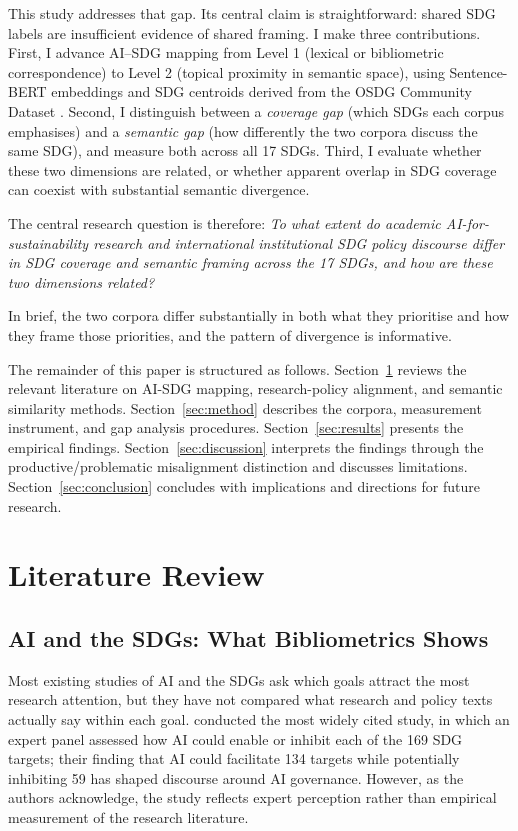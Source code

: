 \documentclass[12pt,a4paper]{article}
\begin{document}
This study addresses that gap. Its central claim is straightforward: shared SDG labels are insufficient evidence of shared framing. I make three contributions. First, I advance AI--SDG mapping from Level 1 (lexical or bibliometric correspondence) to Level 2 (topical proximity in semantic space), using Sentence-BERT \parencite{Reimers2019} embeddings and SDG centroids derived from the OSDG Community Dataset \parencite{Pukelis2022}. Second, I distinguish between a \emph{coverage gap} (which SDGs each corpus emphasises) and a \emph{semantic gap} (how differently the two corpora discuss the same SDG), and measure both across all 17 SDGs. Third, I evaluate whether these two dimensions are related, or whether apparent overlap in SDG coverage can coexist with substantial semantic divergence.

The central research question is therefore: \emph{To what extent do academic AI-for-sustainability research and international institutional SDG policy discourse differ in SDG coverage and semantic framing across the 17 SDGs, and how are these two dimensions related?}

In brief, the two corpora differ substantially in both what they prioritise and how they frame those priorities, and the pattern of divergence is informative.

The remainder of this paper is structured as follows. Section~\ref{sec:litreview} reviews the relevant literature on AI-SDG mapping, research-policy alignment, and semantic similarity methods. Section~\ref{sec:method} describes the corpora, measurement instrument, and gap analysis procedures. Section~\ref{sec:results} presents the empirical findings. Section~\ref{sec:discussion} interprets the findings through the productive/problematic misalignment distinction and discusses limitations. Section~\ref{sec:conclusion} concludes with implications and directions for future research.

\section{Literature Review}
\label{sec:litreview}

\subsection{AI and the SDGs: What Bibliometrics Shows}

Most existing studies of AI and the SDGs ask which goals attract the most research attention, but they have not compared what research and policy texts actually say within each goal. \textcite{Vinuesa2020} conducted the most widely cited study, in which an expert panel assessed how AI could enable or inhibit each of the 169 SDG targets; their finding that AI could facilitate 134 targets while potentially inhibiting 59 has shaped discourse around AI governance. However, as the authors acknowledge, the study reflects expert perception rather than empirical measurement of the research literature.
\end{document}
